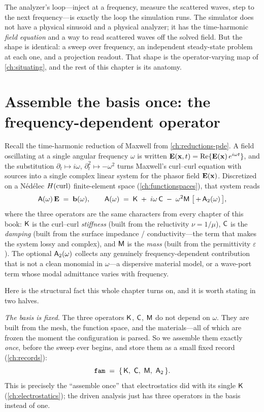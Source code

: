 The analyzer's loop---inject at a frequency, measure the scattered waves, step to
the next frequency---is exactly the loop the simulation runs. The simulator does
not have a physical sinusoid and a physical analyzer; it has the time-harmonic
\emph{field equation} and a way to read scattered waves off the solved field. But
the shape is identical: a sweep over frequency, an independent steady-state
problem at each one, and a projection readout. That shape is the operator-varying
map of \cref{ch:situating}, and the rest of this chapter is its anatomy.

\section{Assemble the basis once: the frequency-dependent operator}
\label{sec:assemble}

Recall the time-harmonic reduction of Maxwell from \cref{ch:reductions-pde}. A
field oscillating at a single angular frequency $\omega$ is written
$\mathbf{E}(\mathbf{x},t) = \operatorname{Re}\{\mathbf{E}(\mathbf{x})\,e^{i\omega t}\}$, and the substitution
$\partial_t \mapsto i\omega$, $\partial_t^2 \mapsto -\omega^2$ turns Maxwell's
curl--curl equation with sources into a single complex linear system for the
phasor field $\mathbf{E}(\mathbf{x})$. Discretized on a Nédélec $H(\mathrm{curl})$ finite-element space
(\cref{ch:functionspaces}), that system reads
\begin{equation}
  \mathsf{A}(\omega)\,\mathbf{E} \;=\; \mathbf{b}(\omega),
  \qquad
  \mathsf{A}(\omega) \;=\; \mathsf{K} \;+\; i\omega\,\mathsf{C} \;-\; \omega^2\mathsf{M}
    \;\bigl[\,+\,\mathsf{A}_2(\omega)\,\bigr],
  \label{eq:driven-system}
\end{equation}
where the three operators are the same characters from every chapter of this
book: $\mathsf{K}$ is the curl--curl \emph{stiffness} (built from the reluctivity
$\nu=1/\mu$), $\mathsf{C}$ is the \emph{damping} (built from the surface impedance /
conductivity---the term that makes the system lossy and complex), and $\mathsf{M}$ is
the \emph{mass} (built from the permittivity $\varepsilon$). The optional
$\mathsf{A}_2(\omega)$ collects any genuinely frequency-dependent contribution that
is not a clean monomial in $\omega$---a dispersive material model, or a
wave-port term whose modal admittance varies with frequency.

Here is the structural fact this whole chapter turns on, and it is worth stating
in two halves.

\emph{The basis is fixed.} The three operators $\mathsf{K}$, $\mathsf{C}$, $\mathsf{M}$ do not
depend on $\omega$. They are built from the mesh, the function space, and the
materials---all of which are frozen the moment the configuration is parsed. So we
assemble them exactly \emph{once}, before the sweep ever begins, and store them as
a small fixed record (\cref{ch:records}):
\[
  \texttt{fam} \;=\; \{\,\Kop,\ \Cop,\ \Mop,\ \mat{A}_2\,\}.
\]
This is precisely the ``assemble once'' that electrostatics did with its single
$\mathsf{K}$ (\cref{ch:electrostatics}); the driven analysis just has three operators in
the basis instead of one.


